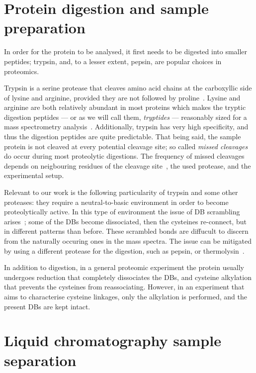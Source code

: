\section{Protein digestion and sample preparation}\label{sec:trypsin}

In order for the protein to be analysed, it first needs to be digested into smaller peptides; trypsin, and, to a lesser extent, pepsin, are popular choices in proteomics.

Trypsin is a serine protease that cleaves amino acid chains at the carboxyllic side of lysine and arginine, provided they are not followed by proline~\cite{olsen2004trypsin}. Lysine and arginine are both relatively abundant in most proteins which makes the tryptic digestion peptides --- or as we will call them, \emph{tryptides} --- reasonably sized for a mass spectrometry analysis~\cite{matthiesen2007mass}. Additionally, trypsin has very high specificity, and thus the digestion peptides are quite predictable. That being said, the sample protein is not cleaved at every potential cleavage site; so called \emph{missed cleavages} do occur during most proteolytic digestions. The frequency of missed cleavages depends on neigbouring residues of the cleavage site~\cite{gershon2014cleaved}, the used protease, and the experimental setup.

Relevant to our work is the following particularity of trypsin and some other proteases: they require a neutral-to-basic environment in order to become proteolytically active. In this type of environment the issue of DB scrambling arises~\cite{wu1997novel}; some of the DBs become dissociated, then the cysteines re-connect, but in different patterns than before. These scrambled bonds are diffucult to discern from the naturally occuring ones in the mass spectra. The issue can be mitigated by using a different protease for the digestion, such as pepsin, or thermolysin~\cite{sung2016evaluation}.

In addition to digestion, in a general proteomic experiment the protein usually undergoes reduction that completely dissociates the DBs, and cysteine alkylation that prevents the cysteines from reassociating. However, in an experiment that aims to characterise cysteine linkages, only the alkylation is performed, and the present DBs are kept intact.

\section{Liquid chromatography sample separation}\label{sec:lc}

